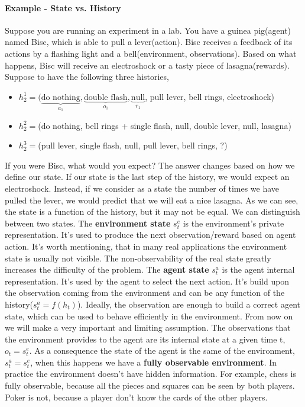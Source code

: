 \documentclass[../main.tex]{subfiles}
\begin{document}
\paragraph{Example - State vs. History} Suppose you are running an experiment in a lab. You have a guinea pig(agent) named Bisc, which is able to pull a lever(action). Bisc receives a feedback of its actions by a flashing light and a bell(environment, observations). Based on what happens, Bisc will receive an electroshock or a tasty piece of lasagna(rewards). Suppose to have the following three histories,
\begin{itemize}
    \item $h_2^1 = (\underbrace{\text{do nothing}}_{a_1}, \underbrace{\text{double flash}}_{o_1}, \underbrace{\text{null}}_{r_1}$, pull lever, bell rings, electroshock)
    \item $h_2^2 = $(do nothing, bell rings + single flash, null, double lever, null, lasagna)
    \item $h_2^3 = $(pull lever, single flash, null, pull lever, bell rings, ?)
\end{itemize}
If you were Bisc, what would you expect? The answer changes based on how we define our state. If our state is the last step of the history, we would expect an electroshock. Instead, if we consider as a state the number of times we have pulled the lever, we would predict that we will eat a nice lasagna.
As we can see, the state is a function of the history, but it may not be equal.
\newline
\newline
We can distinguish between two states. The \textbf{environment state} $s_t^e$ is the environment's private representation. It's used to produce the next observation/reward based on agent action. It's worth mentioning, that in many real applications the environment state is usually not visible. The non-observability of the real state greatly increases the difficulty of the problem.
The \textbf{agent state} $s_t^a$ is the agent internal representation. It's used by the agent to select the next action. It's build upon the observation coming from the environment and can be any function of the history($s_t^a = f(h_t)$). Ideally, the observation are enough to build a correct agent state, which can be used to behave efficiently in the environment. From now on we will make a very important and limiting assumption. The observations that the environment provides to the agent are its internal state at a given time t, $o_t = s_t^e$. As a consequence the state of the agent is the same of the environment, $s_t^a = s_t^e$, when this happens we have a \textbf{fully observable environment}. In practice the environment doesn't have hidden information. For example, chess is fully observable, because all the pieces and squares can be seen by both players. Poker is not, because a player don't know the cards of the other players.
\end{document}
